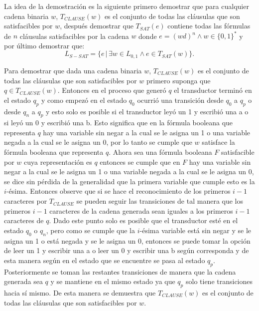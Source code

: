 La idea de la demostración es la siguiente primero demostrar que para cualquier cadena binaria $w$, $T_{CLAUSE}(w)$ es
el conjunto de todas las cláusulas que son satisfacibles por $w$, después demostrar que $T_{SAT}(e)$ contiene todas
las fórmulas de $n$ cláusulas satisfacibles  por la cadena $w$ donde $e=(wd)^n \wedge w\in\{0,1\}^*$ y por último demostrar que:
$$L_{S-SAT} = \{e\,|\,\exists w \in L_{0,1} \wedge e \in T_{SAT}(w) \}.$$

Para demostrar que dada una cadena binaria $w$, $T_{CLAUSE}(w)$ es el conjunto de todas las cláusulas que son satisfacibles
por $w$ primero suponga que $q\in T_{CLAUSE}(w)$. Entonces en el proceso que generó $q$ el transductor terminó en el estado
$q_p$ y como empezó en el estado $q_0$ ocurrió una transición desde $q_0$ a $q_p$ o desde $q_n$ a $q_p$ y esto solo es posible
si el transductor leyó un 1 y escribió una a o si leyó un 0 y escribió una b. Esto significa que en la fórmula booleana
que representa $q$ hay una variable sin negar a la cual se le asigna un 1 o una variable negada a la cual se le asigna un 0,
por lo tanto se cumple que $w$ satisface la fórmula booleana que representa $q$. Ahora sea una fórmula booleana $F$ satisfacible
por $w$ cuya representación es $q$ entonces se cumple que en $F$ hay una variable sin negar a la cual se le asigna un 1 o una variable
negada a la cual se le asigna un 0, se dice sin pérdida de la generalidad que la primera variable que cumple esto es la $i$-ésima.
Entonces observe que si se hace el reconocimiento de los primeros $i-1$ caracteres por $T_{CLAUSE}$ se pueden seguir
las transiciones de tal manera que los primeros $i-1$ caracteres de la cadena generada sean iguales a los primeros $i-1$
caracteres de $q$. Dado este punto solo es posible que el transductor esté en el estado $q_0$ o $q_n$, pero como se cumple
que la $i$-ésima variable está sin negar y se le asigna un 1 o está negada y se le asigna un 0, entonces se puede tomar
la opción de leer un 1 y escribir una a o leer un 0 y escribir una b según corresponda y de esta manera según en el estado que se
encuentre se pasa al estado $q_p$. Posteriormente se toman las restantes transiciones de manera que la cadena generada
sea $q$ y se mantiene en el mismo estado ya que $q_p$ solo tiene transiciones hacia sí mismo. De esta manera se demuestra
que $T_{CLAUSE}(w)$ es el conjunto de todas las cláusulas que son satisfacibles por $w$.


